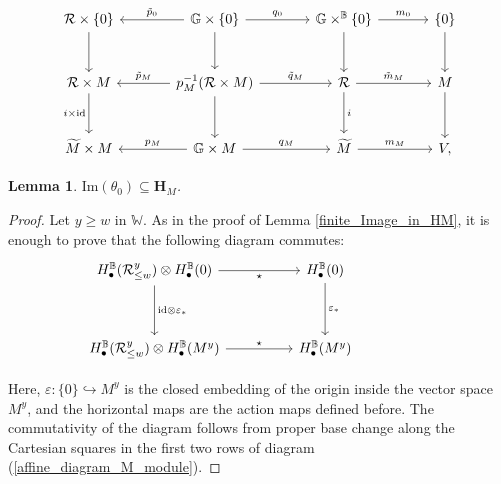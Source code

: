 \documentclass[10pt,a4paper]{amsart}
\newtheorem{lemma}{Lemma}
\renewcommand{\H}{\textbf{H}}
\newcommand{\HBM}[2]{H_\bullet^{#1}(#2)}
\renewcommand{\Im}{\text{Im}}
\newcommand{\R}{\mathcal{R}}
\newcommand{\bbB}{\mathbb{B}}
\newcommand{\bbG}{\mathbb{G}}
\renewcommand{\subset}{\subseteq}
\newcommand{\tM}{\widetilde{M}}
\newcommand{\tW}{\mathbb{W}}
\begin{document}
\begin{equation}
\label{affine_diagram_M_module}
\begin{tikzcd}[column sep=large, row sep=large]
\mathcal{R} \times \{0\} \arrow[d] & \bbG \times \{ 0 \} \arrow[l, "\tilde{p}_0"{above}] \arrow[r, "q_0"] \arrow[d] & \bbG \times^{\bbB} \{ 0 \} \arrow[r, "m_0"] \arrow[d] & \{ 0 \} \arrow[d] \\
\mathcal{R} \times M \arrow[d, "i \times \text{id}"{left}] & p_M^{-1} (\R \times M) \arrow[l, "\tilde{p}_M"{above}] \arrow[r, "\tilde{q}_M"] \arrow[d] & \R \arrow[r, "\tilde{m}_M"] \arrow[d, "i"] & M \arrow[d] \\
\tM \times M & \bbG \times M \arrow[l, "p_M"{above}] \arrow[r, "q_M"{above}] & \tM \arrow[r, "m_M"{above}] & V,
\end{tikzcd}
\end{equation}

\begin{lemma}
\label{affine_Image_in_HM}
    $\Im(\theta_0) \subset \H_M$.
\end{lemma}

\begin{proof}
    Let $y\geq w$ in $\tW$. As in the proof of Lemma \ref{finite_Image_in_HM}, it is enough to prove that the following diagram commutes:
    \[\begin{tikzcd}
	\HBM{\bbB}{\R^y_{\leq w}} \otimes \HBM{\bbB}{0} && \HBM{\bbB}{0} \\
	\\
	\HBM{\bbB}{\R^y_{\leq w}} \otimes \HBM{\bbB}{M^y} && \HBM{\bbB}{M^y}&& 
	\arrow["\star"', from=1-1, to=1-3]
	\arrow["\text{id} \otimes \varepsilon_*", from=1-1, to=3-1]
	\arrow["\varepsilon_*", from=1-3, to=3-3]
	\arrow["\star",from=3-1, to=3-3]
\end{tikzcd}\]

Here, $\varepsilon : \{ 0 \}\hookrightarrow M^y$ is the closed embedding of the origin inside the vector space $M^y$, and the horizontal maps are the action maps defined before. The commutativity of the diagram follows from proper base change along the Cartesian squares in the first two rows of diagram (\ref{affine_diagram_M_module}).
\end{proof}
\end{document}
